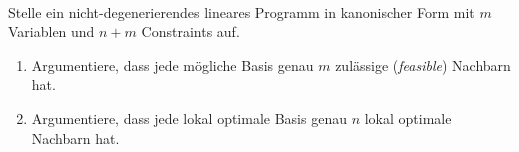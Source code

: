 \documentclass{uebung_cs}
\begin{document}
\begin{aufgabe}\
%
%
	
	Stelle ein nicht-degenerierendes lineares Programm in kanonischer Form mit $m$ Variablen und $n + m$ Constraints auf.
	\begin{enumerate}
		\item Argumentiere, dass jede mögliche Basis genau $m$ zulässige (\textit{feasible}) Nachbarn hat.
		\item Argumentiere, dass jede lokal optimale Basis genau $n$ lokal optimale Nachbarn hat.
	\end{enumerate}
\end{aufgabe}
\end{document}
